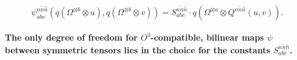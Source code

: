 \begin{lemma}
	
	\begin{align}
		\psi_{abc}^{n\tilde{n}\hat{n}}\left(q\left(\Omega^{\otimes b}\otimes u\right),q\left(\Omega^{\otimes b}\otimes v\right)\right) = S_{abc}^{n\tilde{n}\hat{n}} \cdot q\left(\Omega^{\otimes a}\otimes Q^{n\tilde{n}\hat{n}}(u,v)\right).
		\label{eq:bilinearMapDecomp}
	\end{align}
	
	\textbf{The only degree of freedom for $O^3$-compatible, bilinear maps $\psi$ between symmetric tensors lies in the choice for the constants $S_{abc}^{n\tilde{n}\hat{n}}$.}
\end{lemma}

